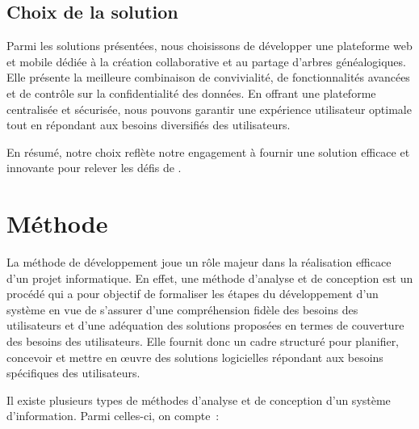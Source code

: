 \subsection{Choix de la solution}
Parmi les solutions présentées, nous choisissons de développer une plateforme web
et mobile dédiée à la création collaborative et au partage d’arbres généalogiques.
Elle présente la meilleure combinaison de convivialité, de fonctionnalités avancées
et de contrôle sur la confidentialité des données. En offrant une plateforme
centralisée et sécurisée, nous pouvons garantir une expérience utilisateur optimale
tout en répondant aux besoins diversifiés des utilisateurs.

En résumé, notre choix reflète notre engagement à fournir une solution
efficace et innovante pour relever les défis de \firm.

\section{Méthode}
La méthode de développement joue un rôle majeur dans la réalisation efficace
d’un projet informatique. En effet, une méthode d’analyse et de conception est
un procédé qui a pour objectif de formaliser les étapes du développement d’un
système en vue de s’assurer d’une compréhension fidèle des besoins des
utilisateurs et d’une adéquation des solutions proposées en termes de couverture
des besoins des utilisateurs. Elle fournit donc un cadre structuré pour planifier,
concevoir et mettre en œuvre des solutions logicielles répondant aux besoins
spécifiques des utilisateurs.

Il existe plusieurs types de méthodes d’analyse et de conception d’un système
d’information. Parmi celles-ci, on compte :

